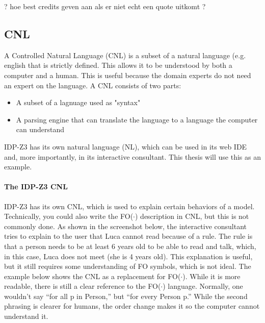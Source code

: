 \documentclass[11pt,a4paper]{report}
\newcommand{\fodot}{FO($\cdot$)\xspace}
\begin{document}

? hoe best credits geven aan \cite{CombiningDMNKnowledge} als er niet echt een quote uitkomt ?

\subsection{CNL}
A Controlled Natural Language (CNL) is a subset of a natural language (e.g. english that is strictly defined. This allows it to be understood by both a computer and a human. This is useful because the domain experts do not need an expert on the language. A CNL consists of two parts:
\begin{itemize}
	\item A subset of a lagnuage used as "syntax" 
    \item A parsing engine that can translate the language to a language the computer can understand
\end{itemize}
IDP-Z3 has its own natural language (NL), which can be used in its web IDE and, more importantly, in its interactive consultant. This thesis will use this as an example.

\paragraph{The IDP-Z3 CNL}
IDP-Z3 has its own CNL, which is used to explain certain behaviors of a model. Technically, you could also write the \fodot description in CNL, but this is not commonly done. As shown in the screenshot below, the interactive consultant tries to explain to the user that Luca cannot read because of a rule. The rule is that a person needs to be at least 6 years old to be able to read and talk, which, in this case, Luca does not meet (she is 4 years old). This explanation is useful, but it still requires some understanding of FO symbols, which is not ideal.
The example below shows the CNL as a replacement for \fodot. While it is more readable, there is still a clear reference to the \fodot language. Normally, one wouldn't say ``for all p in Person,'' but ``for every Person p.'' While the second phrasing is clearer for humans, the order change makes it so the computer cannot understand it.
\end{document}
